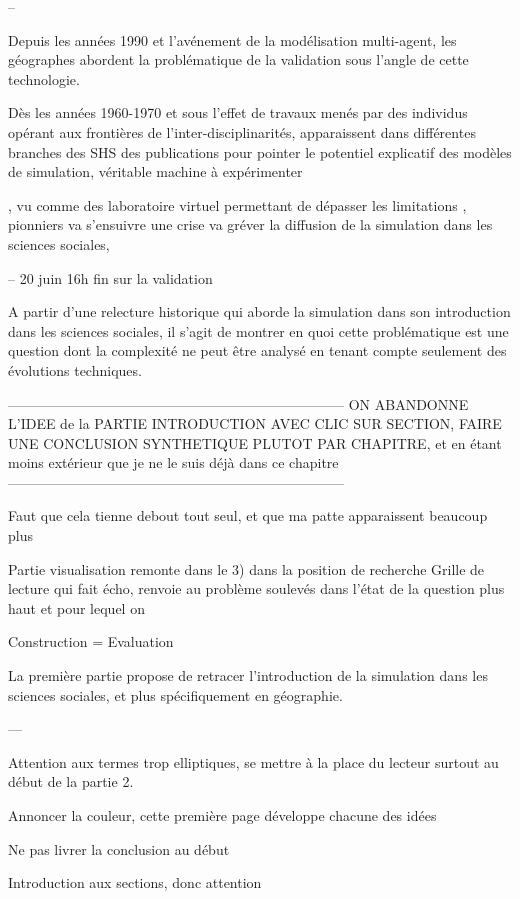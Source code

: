 --

Depuis les années 1990 et l'avénement de la modélisation multi-agent, les géographes abordent la problématique de la validation sous l'angle de cette technologie.

Dès les années 1960-1970 et sous l'effet de travaux menés par des individus opérant aux frontières de l'inter-disciplinarités, apparaissent dans différentes branches des SHS des publications pour pointer le potentiel explicatif des modèles de simulation, véritable machine à expérimenter 

,  vu comme des laboratoire virtuel permettant de dépasser les limitations  ,  pionniers va s'ensuivre une crise va gréver la diffusion de la simulation dans les sciences sociales, 

--
20 juin 16h fin sur la validation 


A partir d'une relecture historique qui aborde la simulation dans son introduction dans les sciences sociales, il s'agit de montrer en quoi cette problématique est une question dont la complexité ne peut être analysé en tenant compte seulement des évolutions techniques.	

------------------------------------------------------------------------
ON ABANDONNE L'IDEE de la PARTIE INTRODUCTION AVEC CLIC SUR SECTION, FAIRE UNE CONCLUSION SYNTHETIQUE PLUTOT PAR CHAPITRE, et en étant moins extérieur que je ne le suis déjà dans ce chapitre
------------------------------------------------------------------------



Faut que cela tienne debout tout seul, et que ma patte apparaissent beaucoup plus 

Partie visualisation remonte dans le 3) dans la position de recherche
Grille de lecture qui fait écho, renvoie au problème soulevés dans l'état de la question plus haut et pour lequel on 






Construction = Evaluation

La première partie propose de retracer l'introduction de la simulation dans les sciences sociales, et plus spécifiquement en géographie. 




---

Attention aux termes trop elliptiques, se mettre à la place du lecteur surtout au début de la partie 2.

Annoncer la couleur, cette première page développe chacune des idées 


Ne pas livrer la conclusion au début 

Introduction aux sections, donc attention 



\printbibliography[heading=subbibliography]

\stopcontents[chapters]
